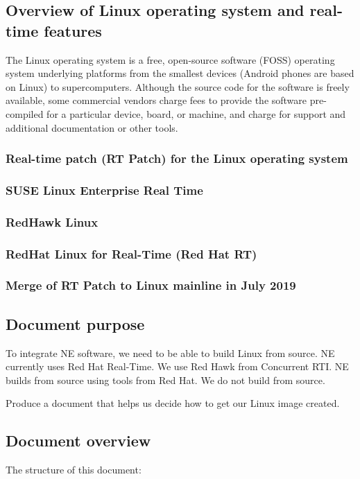 \documentclass[12pt]{article}
\begin{document}
\subsection{Overview of Linux operating system and real-time features}
The Linux operating system is a free, open-source software (FOSS) operating system underlying platforms from the smallest devices
(Android phones are based on Linux) to supercomputers. Although the source code for the software is freely available,
some commercial vendors charge fees to provide the software pre-compiled for a particular device, board, or machine,
and charge for support and additional documentation or other tools.

\subsubsection{Real-time patch (RT Patch) for the Linux operating system}

\subsubsection{SUSE Linux Enterprise Real Time}


\subsubsection{RedHawk Linux}


\subsubsection{RedHat Linux for Real-Time (Red Hat RT)}


\subsubsection{Merge of RT Patch to Linux mainline in July 2019}

\subsection{Document purpose}
To integrate NE software, we need to be able to build Linux from source.  NE currently uses Red Hat Real-Time.
 We use Red Hawk from Concurrent RTI.  NE builds from source using tools from Red Hat.  We do not build from source.

Produce a document that helps us decide how to get our Linux image created.


\subsection{Document overview}
The structure of this document:
\end{document}
